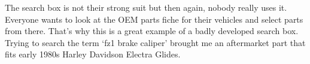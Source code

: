 \documentclass[10pt,letterpaper,bibliography=totocnumbered]{scrartcl}
\begin{document}
The search box is not their strong suit but then again, nobody really uses it. Everyone wants to look at the OEM parts fiche for their vehicles and select parts from there. That's why this is a great example of a badly developed search box. Trying to search the term `fz1 brake caliper' brought me an aftermarket part that fits early 1980s Harley Davidson Electra Glides. 
\end{document}
